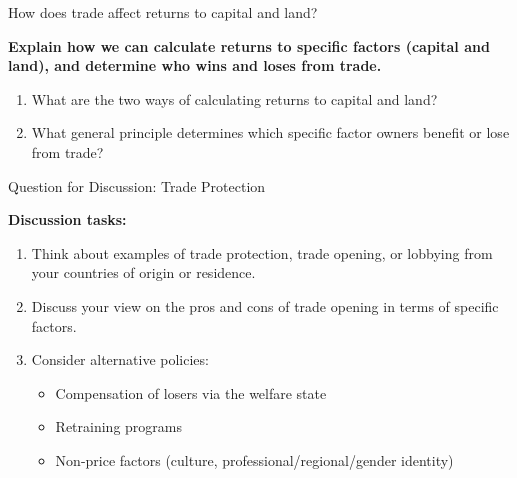 \documentclass{beamer}
\begin{document}
\begin{frame}{How does trade affect returns to capital and land?}

\textbf{Explain how we can calculate returns to specific factors (capital and land), and determine who wins and loses from trade.}

\vspace{0.3cm}

\begin{enumerate}
    \item What are the two ways of calculating returns to capital and land?
    
    
    \vspace{0.2cm}
    
    \item What general principle determines which specific factor owners benefit or lose from trade?
\end{enumerate}

\end{frame}



\begin{frame}{Question for Discussion: Trade Protection}

\textbf{Discussion tasks:}

\vspace{0.3cm}

\begin{enumerate}
    \item Think about examples of trade protection, trade opening, or lobbying from your countries of origin or residence.
    
    \vspace{0.3cm}
    
    \item Discuss your view on the pros and cons of trade opening in terms of specific factors.
    
    \vspace{0.3cm}
    
    \item Consider alternative policies:
    \begin{itemize}
        \item Compensation of losers via the welfare state
        \item Retraining programs
        \item Non-price factors (culture, professional/regional/gender identity)
    \end{itemize}
\end{enumerate}

\end{frame}
\end{document}
